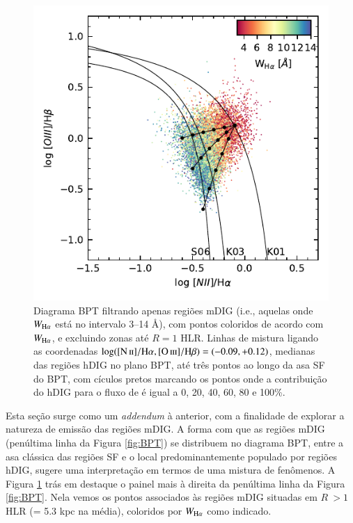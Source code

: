 \begin{figure}
 \includegraphics{figuras/fig_BPT_mixed_lines.pdf}
 \caption[Diagrama BPT -- mDIG]
 {Diagrama BPT filtrando apenas regiões mDIG (i.e., aquelas onde $W_{\Ha}$ está no intervalo 3--14 \AA), com pontos coloridos de acordo com $W_{\Ha}$, e excluindo zonas até $R = 1$ HLR. Linhas de mistura ligando as coordenadas $\log(\nii/\Ha,\oiii/\Hb) = (-0.09,+0.12)$, medianas das regiões hDIG no plano BPT, até três pontos ao longo da asa SF do BPT, com cículos pretos marcando os pontos onde a contribuição do hDIG para o fluxo de \Ha é igual a 0, 20, 40, 60, 80 e 100\%.}
 \label{fig:BPT_mDIG}
\end{figure}

Esta seção surge como um {\em addendum} à anterior, com a finalidade de explorar a natureza de emissão das regiões mDIG. A forma com que as regiões mDIG (penúltima linha da Figura \ref{fig:BPT}) se distribuem no diagrama BPT, entre a asa clássica das regiões SF e o local predominantemente populado por regiões hDIG, sugere uma interpretação em termos de uma mistura de fenômenos.
A Figura \ref{fig:BPT_mDIG} trás em destaque o painel mais à direita da penúltima linha da Figura \ref{fig:BPT}. Nela vemos os pontos associados às regiões mDIG situadas em $R\ > 1$ HLR (= 5.3 kpc na média), coloridos por $W_{\Ha}$ como indicado.

